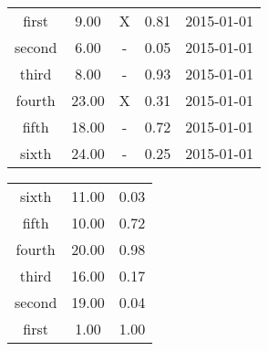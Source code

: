 %
%


%
%
\begin{tabular}{c|c|c|c|c|}
first & 9.00 & X & 0.81 & 2015-01-01\\
second & 6.00 & - & 0.05 & 2015-01-01\\
third & 8.00 & - & 0.93 & 2015-01-01\\
fourth & 23.00 & X & 0.31 & 2015-01-01\\
fifth & 18.00 & - & 0.72 & 2015-01-01\\
sixth & 24.00 & - & 0.25 & 2015-01-01
\end{tabular}

%
%
\begin{tabular}{c|c|c|}
sixth & 11.00 & 0.03\\
fifth & 10.00 & 0.72\\
fourth & 20.00 & 0.98\\
third & 16.00 & 0.17\\
second & 19.00 & 0.04\\
first & 1.00 & 1.00
\end{tabular}